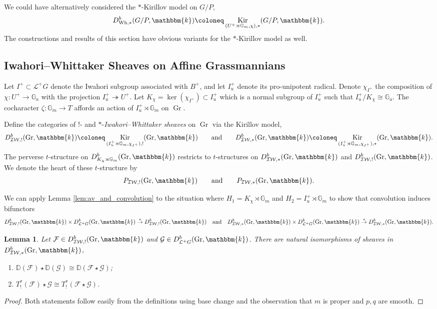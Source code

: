 \documentclass{amsart}
\renewcommand{\L}{\mathcal{L}}
\newcommand{\G}{\mathbb{G}}
\renewcommand{\k}{\mathbbm{k}}
\newcommand{\scrF}{\mathcal{F}}
\newcommand{\scrG}{\mathcal{G}}
\newcommand{\IW}{\mathcal{IW}}
\newcommand{\DD}{\mathbb{D}}
\DeclareMathOperator{\Gr}{Gr}
\DeclareMathOperator{\Wh}{Wh}
\DeclareMathOperator{\Kir}{Kir}
\newtheorem{lemma}[subsubsection]{Lemma}
\theoremstyle{definition}
\begin{document}
    We could have alternatively considered the $*$-Kirillov model on $G/P$,
    \[D_{\Wh, *}^b (G/P, \k) \coloneq \Kir_{(U^+ \rtimes \G_m, \chi), *} (G/P, \k).\]
    The constructions and results of this section have obvious variants for the $*$-Kirillov model as well.

    \subsection{Iwahori--Whittaker Sheaves on Affine Grassmannians}

    Let $I^+ \subset \L^+ G$ denote the Iwahori subgroup associated with $B^+$, and let $I_u^+$ denote its pro-unipotent radical.
    Denote $\chi_{I^+}$ the composition of $\chi : U^{+} \to \G_a$ with the projection $I_u^+ \twoheadrightarrow U^+$.
    Let $K_{\chi} = \ker (\chi_{I^+}) \subset I_u^+$ which is a normal subgroup of $I_u^+$ such that $I_u^+/K_{\chi} \cong \G_a$. 
    The cocharacter $\zeta : \G_m \to T$ affords an action of $I_u^+ \rtimes \G_m$ on $\Gr$.
    
    Define the categories of $!$- and $*$-\emph{Iwahori--Whittaker sheaves} on $\Gr$ via the Kirillov model,
    \[D_{\IW, !}^b (\Gr, \k) \coloneq \Kir_{(I_u^+ \rtimes \G_m, \chi_{I^+}), !} (\Gr,\k) \qquad\text{and}\qquad D_{\IW, *}^b (\Gr, \k) \coloneq \Kir_{(I_u^+ \rtimes \G_m, \chi_{I^+}), *} (\Gr,\k).\]  
    The perverse $t$-structure on $D_{K_{\chi} \rtimes \G_m}^b (\Gr, \k)$ restricts to $t$-structures on $D_{\IW, *}^b (\Gr, \k)$ and $D_{\IW, !}^b (\Gr, \k)$. We denote the heart of these $t$-structure by
    \[P_{\IW, !} (\Gr, \k) \qquad\text{and}\qquad P_{\IW, *} (\Gr, \k).\]

    We can apply Lemma \ref{lem:av_and_convolution} to the situation where $H_1 = K_{\chi} \rtimes \G_m$ and $H_2 = I_u^+ \rtimes \G_m$ to show that convolution induces bifunctors
    \[D_{\IW, !}^b (\Gr, \k) \times D_{\L^+ G}^b (\Gr, \k) \stackrel{\star}{\to} D_{\IW, !}^b (\Gr, \k) \quad\text{and}\quad D_{\IW, *}^b (\Gr, \k) \times D_{\L^+ G}^b (\Gr, \k) \stackrel{\star}{\to} D_{\IW, *}^b (\Gr, \k).\]

    \begin{lemma}\label{lem:iw_action_commutes_with_D_and_T}
        Let $\scrF \in D_{\IW, !}^b (\Gr, \k)$ and $\scrG \in D_{\L^+ G}^b (\Gr, \k)$. There are natural isomorphisms of sheaves in $D_{\IW, *}^b (\Gr, \k)$,
        \begin{enumerate}
            \item $\DD (\scrF) \star \DD (\scrG) \cong \DD (\scrF \star \scrG)$;
            \item $T_!^* (\scrF) \star \scrG \cong T_!^* (\scrF \star \scrG)$.
        \end{enumerate}
    \end{lemma}
    \begin{proof}
        Both statements follow easily from the definitions using base change and the observation that $m$ is proper and $p,q$ are smooth.
    \end{proof}
\end{document}
